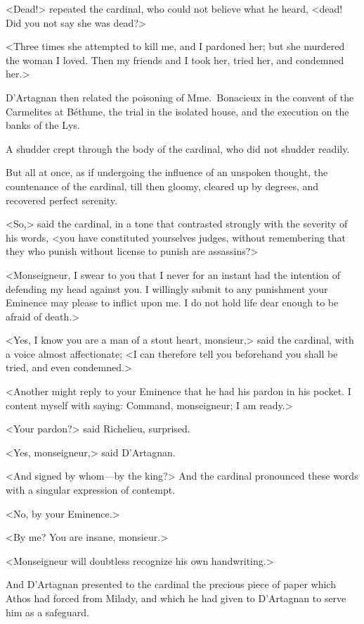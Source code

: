<Dead!> repeated the cardinal, who could not believe what he heard, <dead! Did you not say she was dead?> 

<Three times she attempted to kill me, and I pardoned her; but she murdered the woman I loved. Then my friends and I took her, tried her, and condemned her.> 

D'Artagnan then related the poisoning of Mme.~Bonacieux in the convent of the Carmelites at Béthune, the trial in the isolated house, and the execution on the banks of the Lys. 

A shudder crept through the body of the cardinal, who did not shudder readily. 

But all at once, as if undergoing the influence of an unspoken thought, the countenance of the cardinal, till then gloomy, cleared up by degrees, and recovered perfect serenity. 

<So,> said the cardinal, in a tone that contrasted strongly with the severity of his words, <you have constituted yourselves judges, without remembering that they who punish without license to punish are assassins?> 

<Monseigneur, I swear to you that I never for an instant had the intention of defending my head against you. I willingly submit to any punishment your Eminence may please to inflict upon me. I do not hold life dear enough to be afraid of death.> 

<Yes, I know you are a man of a stout heart, monsieur,> said the cardinal, with a voice almost affectionate; <I can therefore tell you beforehand you shall be tried, and even condemned.> 

<Another might reply to your Eminence that he had his pardon in his pocket. I content myself with saying: Command, monseigneur; I am ready.> 

<Your pardon?> said Richelieu, surprised. 

<Yes, monseigneur,> said D'Artagnan. 

<And signed by whom—by the king?> And the cardinal pronounced these words with a singular expression of contempt. 

<No, by your Eminence.> 

<By me? You are insane, monsieur.> 

<Monseigneur will doubtless recognize his own handwriting.> 

And D'Artagnan presented to the cardinal the precious piece of paper which Athos had forced from Milady, and which he had given to D'Artagnan to serve him as a safeguard. 

